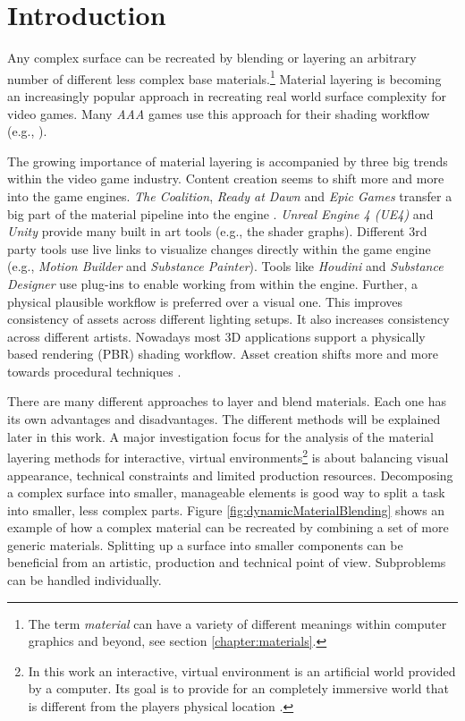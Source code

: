 
\chapter{Introduction}\label{chahpter:introduction}

Any complex surface can be recreated by blending or layering an arbitrary number of different less complex base materials.\footnote{The term \emph{material} can have a variety of different meanings within computer graphics and beyond, see section \ref{chapter:materials}.} Material layering is becoming an increasingly popular approach in recreating real world surface complexity for video games. Many \emph{AAA} games use this approach for their shading workflow (e.g., \cite{naugthy2016uncharted, witcher2015cdproject, order2015readyatdawns, paragon2016epic, gears2016coalition}). 

The growing importance of material layering is accompanied by three big trends within the video game industry. Content creation seems to shift more and more into the game engines. \emph{The Coalition}, \emph{Ready at Dawn} and \emph{Epic Games} transfer a big part of the material pipeline into the engine \cite{colin2017GearsOfWar, moore2017pipeline, neubelt2013crafting}. \emph{Unreal Engine 4 (UE4)} and \emph{Unity} provide many built in art tools (e.g., the shader graphs). Different 3rd party tools use live links to visualize changes directly within the game engine (e.g., \emph{Motion Builder} and \emph{Substance Painter}). Tools like \emph{Houdini} and \emph{Substance Designer} use plug-ins to enable working from within the engine. Further, a physical plausible workflow is preferred over a visual one. This improves consistency of assets across different lighting setups. It also increases consistency across different artists. Nowadays most 3D applications support a physically based rendering (PBR) shading workflow. Asset creation shifts more and more towards procedural techniques \cite{price2018ai}. 

There are many different approaches to layer and blend materials. Each one has its own advantages and disadvantages. The different methods will be explained later in this work. A major investigation focus for the analysis of the material layering methods for interactive, virtual environments\footnote{In this work an interactive, virtual environment is an artificial world provided by a computer. Its goal is to provide for an completely immersive world that is different from the players physical location \cite[p.\,9,\,30]{jerald2015vr}\cite[p.\,743]{gregory2015game}.} is about balancing visual appearance, technical constraints and limited production resources. Decomposing a complex surface into smaller, manageable elements is good way to split a task into smaller, less complex parts. Figure \ref{fig:dynamicMaterialBlending} shows an example of how a complex material can be recreated by combining a set of more generic materials. Splitting up a surface into smaller components can be beneficial from an artistic, production and technical point of view. Subproblems can be handled individually.     
 

